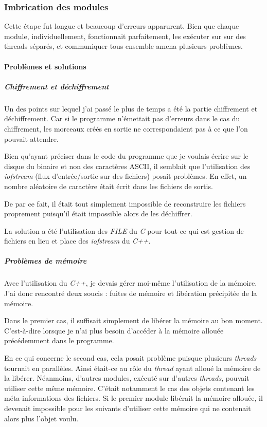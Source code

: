 \documentclass[a4paper,10pt, twoside]{report}
\begin{document}
\begin{spacing}{1.2}
\subsubsection{Imbrication des modules}
Cette \'etape fut longue et beaucoup d'erreurs apparurent. Bien que chaque
module, individuellement, fonctionnait parfaitement, les ex\'ecuter sur sur des
threads s\'epar\'es, et communiquer tous ensemble amena plusieurs probl\`emes.

\paragraph{Probl\`emes et solutions}

\subparagraph{Chiffrement et d\'echiffrement\\}
Un des points sur lequel j'ai pass\'e le plus de temps a \'et\'e la partie
chiffrement et d\'echiffrement. Car si le programme n'\'emettait pas d'erreurs
dans le cas du chiffrement, les morceaux cr\'e\'es en sortie ne correspondaient
pas \`a ce que l'on pouvait attendre.

Bien qu'ayant pr\'eciser dans le code du programme que je voulais \'ecrire
sur le disque du binaire et non des caract\`eres ASCII, il semblait que
l'utilisation des \textit{iofstream} (flux d'entr\'ee/sortie sur des fichiers)
posait probl\`emes. En effet, un nombre al\'eatoire de caract\`ere \'etait
\'ecrit dans les fichiers de sortis. 

De par ce fait, il \'etait tout simplement impossible de reconstruire les
fichiers proprement puisqu'il \'etait impossible alors de les d\'echiffrer.

La solution a \'et\'e l'utilisation des \textit{FILE} du \textit{C} pour tout
ce qui est gestion de fichiers en lieu et place des \textit{iofstream} du
\textit{C++}.

\subparagraph{Probl\`emes de m\'emoire\\}
Avec l'utilisation du \textit{C++}, je devais g\'erer moi-m\^eme l'utilisation
de la m\'emoire. J'ai donc rencontr\'e deux soucis : fuites de m\'emoire et
lib\'eration pr\'ecipit\'ee de la m\'emoire.

Dans le premier cas, il suffisait simplement de lib\'erer la m\'emoire au bon
moment. C'est-\`a-dire lorsque je n'ai plus besoin d'acc\'eder \`a la m\'emoire
allou\'ee pr\'ec\'edemment dans le programme.

En ce qui concerne le second cas, cela posait probl\`eme puisque plusieurs
\textit{threads} tournait en parall\`eles. Ainsi \'etait-ce au r\^ole du
\textit{thread} ayant allou\'e la m\'emoire de la lib\'erer. N\'eanmoins,
d'autres modules, ex\'ecut\'e sur d'autres \textit{threads}, pouvait utiliser
cette m\^eme m\'emoire. C'\'etait notamment le cas des objets contenant les
m\'eta-informations des fichiers. Si le premier module lib\'erait la m\'emoire
allou\'ee, il devenait impossible pour les suivants d'utiliser cette m\'emoire
qui ne contenait alors plus l'objet voulu.


\end{spacing}
\end{document}

